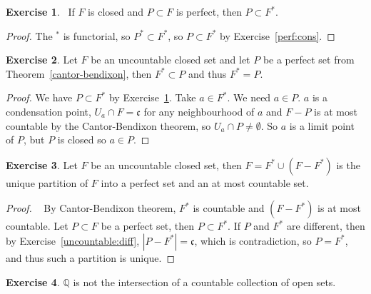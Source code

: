 \documentclass[8pt]{article}
\theoremstyle{definition}
\theoremstyle{definition}
\theoremstyle{definition}
\theoremstyle{definition}
\theoremstyle{definition}
\theoremstyle{definition}
\theoremstyle{definition}
\theoremstyle{definition}
\theoremstyle{definition}
\theoremstyle{definition}
\theoremstyle{definition}
\theoremstyle{definition}
\theoremstyle{definition}
\newtheorem{exercise}{Exercise}[section]
\theoremstyle{definition}
\theoremstyle{question}
\begin{document}
\begin{exercise}~\label{monotone:2}
  If $F$ is closed and $P \subset F$ is perfect, then $P \subset F^*$.
\end{exercise}

\begin{proof}
  The $^*$ is functorial, so $P^* \subset F^*$, so $P \subset F^*$ by Exercise~\ref{perf:cons}.
\end{proof}

\begin{exercise}
  Let $F$ be an uncountable closed set and let $P$ be a perfect set from Theorem~\ref{cantor-bendixon}, then
  $F^* \subset P$ and thus $F^* = P$.
\end{exercise}

\begin{proof}
  We have $P \subset F^*$ by Exercise~\ref{monotone:2}. Take $a \in F^*$. We need $a \in P$.
  $a$ is a condensation point, $U_a \cap F = \mathfrak{c}$ for any neighbourhood of $a$ and $F - P$ is at most
  countable by the Cantor-Bendixon theorem,
  so $U_a \cap P \neq \emptyset$. So $a$ is a limit point of $P$, but $P$ is closed so $a \in P$.
\end{proof}

\begin{exercise}
  Let $F$ be an uncountable closed set, then $F = F^* \cup (F - F^*)$ is the unique partition of
  $F$ into a perfect set and an at most countable set.
\end{exercise}

\begin{proof}~\label{monotone:2}
  By Cantor-Bendixon theorem, $F^*$ is countable and $(F - F^*)$ is at most countable.
  Let $P \subset F$ be a perfect set, then $P \subset F^*$. If $P$ and $F^*$ are different, then
  by Exercise~\ref{uncountable:diff}, $|P - F^*| = \mathfrak{c}$, which is contradiction, so $P = F^*$, and thus
  such a partition is unique.
\end{proof}

\begin{exercise}
  $\mathbb{Q}$ is not the intersection of a countable collection of open sets.
\end{exercise}
\end{document}
